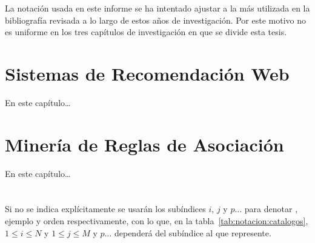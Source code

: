 La notación usada en este informe se ha intentado ajustar a la más utilizada en la bibliografía revisada a lo largo de estos años de investigación. Por este motivo no es uniforme en los tres capítulos de investigación en que se divide esta tesis.

\section{Sistemas de Recomendación Web}
\label{sec:notacion:srw}
En este capítulo\ldots




\section{Minería de Reglas de Asociación}
\label{sec:notacion:arm}
En este capítulo\ldots




\section{\Catalogos}
\label{sec:notacion:catalogos}

Si no se indica explícitamente se usarán los subíndices $i$, $j$ y $p\ldots$ para denotar \atributo, ejemplo y orden respectivamente, con lo que, en la tabla~\ref{tab:notacion:catalogos}, $1\leq i\leq N$ y $1\leq j\leq M$ y $p\ldots$ dependerá del subíndice al que represente.

